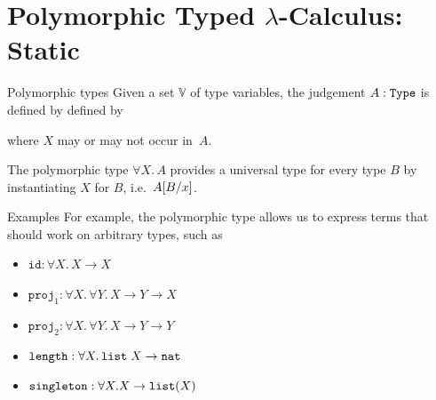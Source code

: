 \section{Polymorphic Typed \texorpdfstring{$\lambda$}{λ}-Calculus: Static}
\begin{frame}{Polymorphic types}
    Given a set $\mathbb{V}$ of type variables, the judgement $A : \type$ is defined by
    defined by
      \begin{prooftree}
      \end{prooftree}
      \begin{prooftree}
      \end{prooftree}
      \begin{prooftree}
      \end{prooftree}
  where $X$ may or may not occur in~$A$.

  The polymorphic type $\forall X.\, A$ provides a universal type for every type $B$ by instantiating $X$ for $B$, i.e.\ $A\subst{B}{x}$.
\end{frame}

\begin{frame}{Examples}
  For example, the polymorphic type allows us to express terms that should work on arbitrary types, such as
  \begin{itemize}
    \item $\mathtt{id} : \forall X.\, X \to X$

    \item $\mathtt{proj}_1 : \forall X.\,\forall Y.\, X \to Y \to X$

    \item $\mathtt{proj}_2 : \forall X.\,\forall Y.\, X \to Y \to Y$

    \item $\mathtt{length} : \forall X.\, \List\;X \to \nat$

    \item $\mathtt{singleton} : \forall X. X \to \List(X)$
  \end{itemize}
  
\end{frame}

